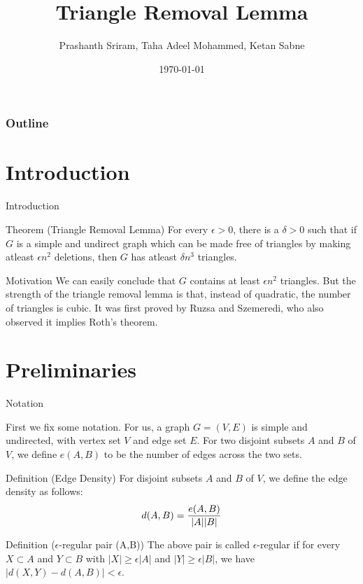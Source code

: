 \documentclass[10pt]{beamer}
\title[Combinatorics]{Triangle Removal Lemma}%
\author[PS, TAM, KS]{Prashanth Sriram, Taha Adeel Mohammed, Ketan Sabne}%
\institute[IITH]{Indian Institute of Technology Hyderabad}
\date[\textcolor{white}{}]
{\today}
\begin{document}
\frame{\titlepage}

\begin{frame}
	\frametitle{Outline}
	\tableofcontents
\end{frame}


\section{Introduction}

\begin{frame}{Introduction}
	\begin{block}{Theorem (Triangle Removal Lemma)}
		For every $\epsilon > 0$, there is a $\delta > 0$ such that if $G$ is a simple and undirect graph which can be made free of triangles by making atleast $\epsilon n^2$ deletions, then $G$ has atleast $\delta n^3 $ triangles.
	\end{block}

	\begin{block}{Motivation}
		We can easily conclude that $G$ contains at least $\epsilon n^2$ triangles. But the strength of the triangle removal lemma is that, instead of quadratic, the number of triangles is cubic. It was first proved by Ruzsa and Szemeredi, who also observed it implies Roth's theorem.
	\end{block}
\end{frame}


\section{Preliminaries}
\begin{frame}{Notation}
	\begin{block}{}
			First we fix some notation. For us, a graph $G = (V, E)$ is simple
		and undirected, with vertex set $V$ and edge set $E$. For two disjoint
		subsets $A$ and $B$ of $V$, we define $e(A, B)$ to be the number of
		edges across the two sets.
	\end{block}

	\begin{block}{Definition (Edge Density)}
		For disjoint subsets $A$ and $B$ of $V$, we define the edge density as follows:
		\begin{align*} \vspace*{-4mm}
			d(A, B) = \frac{e(A, B)}{|A||B|}
		\end{align*}
	\end{block}

	\begin{block}{Definition ($\epsilon$-regular pair (A,B))}
		The above pair is called $\epsilon$-regular if for every $X \subset A$ and $Y \subset B$ with $|X| \geq \epsilon |A|$ and $|Y| \geq \epsilon |B|$, we have $|d(X, Y) - d(A, B)| < \epsilon$.
	\end{block}
	
\end{frame}
\end{document}
